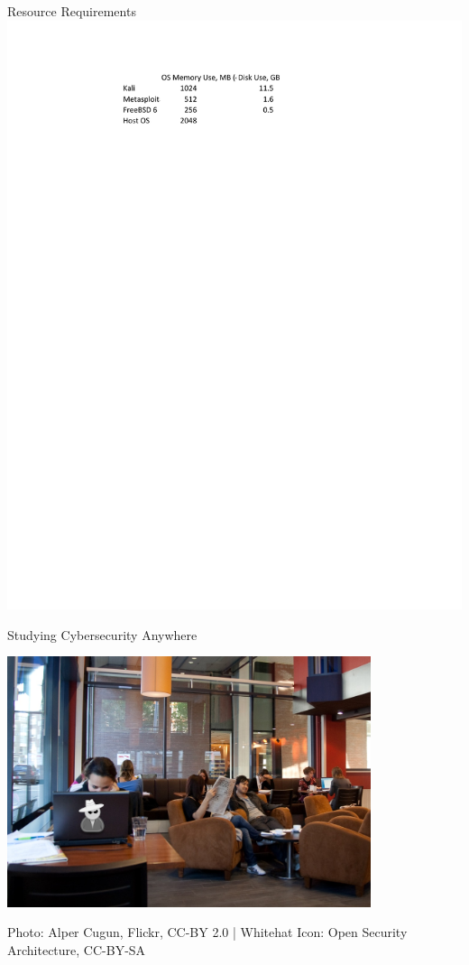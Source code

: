 \documentclass{beamer}
\begin{document}
	\begin{frame}{Resource Requirements}
		\includegraphics[page=2,width=\textwidth, clip=true, trim=0.5in 6in 1in 0.5in]{Resources.pdf}
	\end{frame}
		
	\begin{frame}{Studying Cybersecurity Anywhere}
		\begin{center}
		\includegraphics[width=0.8\textwidth]{coffeeshop_whitehat.jpg}
		
		{\tiny Photo: Alper Cugun, Flickr, CC-BY 2.0 | Whitehat Icon: Open Security Architecture, CC-BY-SA}
		\end{center}
	\end{frame}
			
\end{document}

